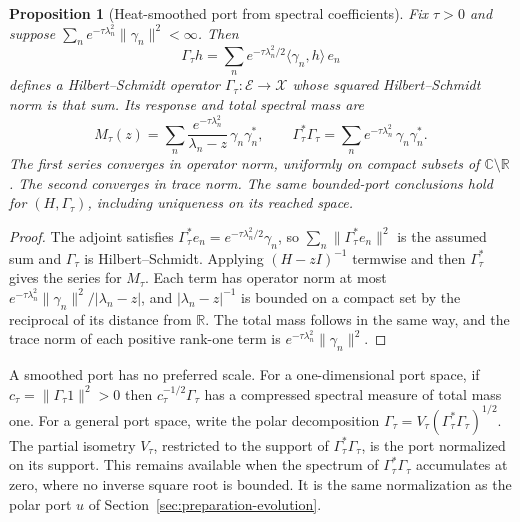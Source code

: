 \documentclass[11pt]{article}
\newtheorem{proposition}{Proposition}[section]
\theoremstyle{definition}
\newcommand{\C}{\mathbb C}
\newcommand{\R}{\mathbb R}
\begin{document}
\begin{proposition}[Heat-smoothed port from spectral coefficients]
\label{prop:passive-heat-discrete}
Fix $\tau>0$ and suppose $\sum_{n}e^{-\tau\lambda_n^2}\|\gamma_n\|^2<\infty$. Then
\begin{equation}
 \Gamma_\tau h=\sum_ne^{-\tau\lambda_n^2/2}\langle\gamma_n,h\rangle\,e_n
 \label{eq:passive-heat-discrete-port}
\end{equation}
defines a Hilbert--Schmidt operator $\Gamma_\tau:\mathcal E\to\mathcal X$ whose squared Hilbert--Schmidt norm is that sum. Its response and total spectral mass are
\begin{equation}
 M_\tau(z)=\sum_n\frac{e^{-\tau\lambda_n^2}}{\lambda_n-z}\,\gamma_n\gamma_n^* ,\qquad
 \Gamma_\tau^*\Gamma_\tau=\sum_ne^{-\tau\lambda_n^2}\,\gamma_n\gamma_n^* .
 \label{eq:passive-heat-discrete-response}
\end{equation}
The first series converges in operator norm, uniformly on compact subsets of $\C\setminus\R$. The second converges in trace norm. The same bounded-port conclusions hold for $(H,\Gamma_\tau)$, including uniqueness on its reached space.
\end{proposition}
\begin{proof}
The adjoint satisfies $\Gamma_\tau^*e_n=e^{-\tau\lambda_n^2/2}\gamma_n$, so $\sum_n\|\Gamma_\tau^*e_n\|^2$ is the assumed sum and $\Gamma_\tau$ is Hilbert--Schmidt. Applying $(H-zI)^{-1}$ termwise and then $\Gamma_\tau^*$ gives the series for $M_\tau$. Each term has operator norm at most $e^{-\tau\lambda_n^2}\|\gamma_n\|^2/|\lambda_n-z|$, and $|\lambda_n-z|^{-1}$ is bounded on a compact set by the reciprocal of its distance from $\R$. The total mass follows in the same way, and the trace norm of each positive rank-one term is $e^{-\tau\lambda_n^2}\|\gamma_n\|^2$.
\end{proof}

A smoothed port has no preferred scale. For a one-dimensional port space, if $c_\tau=\|\Gamma_\tau1\|^2>0$ then $c_\tau^{-1/2}\Gamma_\tau$ has a compressed spectral measure of total mass one. For a general port space, write the polar decomposition $\Gamma_\tau=V_\tau(\Gamma_\tau^*\Gamma_\tau)^{1/2}$. The partial isometry $V_\tau$, restricted to the support of $\Gamma_\tau^*\Gamma_\tau$, is the port normalized on its support. This remains available when the spectrum of $\Gamma_\tau^*\Gamma_\tau$ accumulates at zero, where no inverse square root is bounded. It is the same normalization as the polar port $u$ of Section~\ref{sec:preparation-evolution}.
\end{document}
